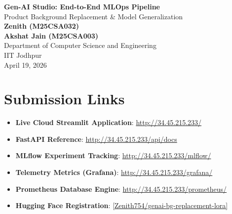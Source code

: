\documentclass[11pt,a4paper]{article}
\begin{document}
\begin{center}
    {\LARGE \textbf{Gen-AI Studio: End-to-End MLOps Pipeline}}\\[10pt]
    {\large Product Background Replacement \& Model Generalization}\\[10pt]
    \textbf{Zenith (M25CSA032)}\\
    \textbf{Akshat Jain (M25CSA003)}\\[4pt]
    Department of Computer Science and Engineering\\
    IIT Jodhpur\\[6pt]
    April 19, 2026
\end{center}

\vspace{10pt}

\begin{abstract}
This report walks through the completion of our \textbf{Gen-AI Studio} project. Our main goal was to build a full MLOps pipeline for a generative AI tool that replaces e-commerce product backgrounds. We used Stable Diffusion Inpainting alongside a LoRA adapter to generate custom backgrounds from user text prompts. More importantly, this report covers how we addressed the instructor's poster feedback regarding system generalization and evaluation metrics. We also documented our journey setting up completely open-source tracking tools (MLflow, Prometheus, and Grafana) rather than using black-box cloud services.
\end{abstract}

\section*{Submission Links}
\begin{itemize}[leftmargin=*]
    \item \textbf{Live Cloud Streamlit Application}: \href{http://34.45.215.233/}{http://34.45.215.233/}
    \item \textbf{FastAPI Reference}: \href{http://34.45.215.233/api/docs}{http://34.45.215.233/api/docs}
    \item \textbf{MLflow Experiment Tracking}: \href{http://34.45.215.233/mlflow/}{http://34.45.215.233/mlflow/}
    \item \textbf{Telemetry Metrics (Grafana)}: \href{http://34.45.215.233/grafana/}{http://34.45.215.233/grafana/}
    \item \textbf{Prometheus Database Engine}: \href{http://34.45.215.233/prometheus/}{http://34.45.215.233/prometheus/}
    \item \textbf{Hugging Face Registration}: \href{https://huggingface.co/Zenith754/genai-bg-replacement-lora}{[Zenith754/genai-bg-replacement-lora]}
\end{itemize}
\end{document}
